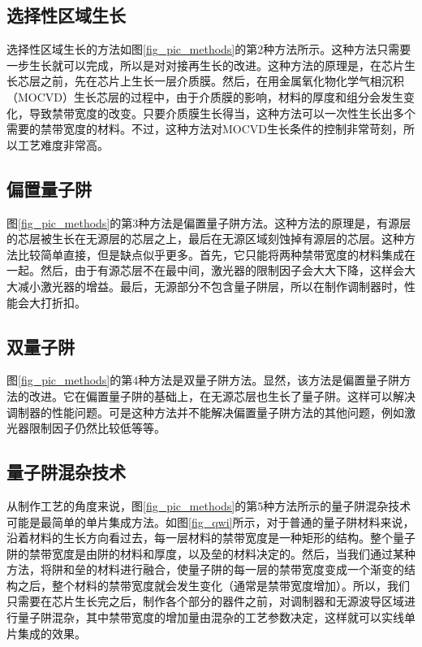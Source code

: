 \documentclass[oneside]{ZJUthesis}
\begin{document}
\subsection{选择性区域生长}

选择性区域生长的方法如图\ref{fig_pic_methods}的第2种方法所示。这种方法只需要一步生长就可以完成，所以是对对接再生长的改进。这种方法的原理是，在芯片生长芯层之前，先在芯片上生长一层介质膜。然后，在用金属氧化物化学气相沉积（MOCVD）生长芯层的过程中，由于介质膜的影响，材料的厚度和组分会发生变化，导致禁带宽度的改变。只要介质膜生长得当，这种方法可以一次性生长出多个需要的禁带宽度的材料。不过，这种方法对MOCVD生长条件的控制非常苛刻，所以工艺难度非常高。

\subsection{偏置量子阱}

图\ref{fig_pic_methods}的第3种方法是偏置量子阱方法。这种方法的原理是，有源层的芯层被生长在无源层的芯层之上，最后在无源区域刻蚀掉有源层的芯层。这种方法比较简单直接，但是缺点似乎更多。首先，它只能将两种禁带宽度的材料集成在一起。然后，由于有源芯层不在最中间，激光器的限制因子会大大下降，这样会大大减小激光器的增益。最后，无源部分不包含量子阱层，所以在制作调制器时，性能会大打折扣。

\subsection{双量子阱}

图\ref{fig_pic_methods}的第4种方法是双量子阱方法。显然，该方法是偏置量子阱方法的改进。它在偏置量子阱的基础上，在无源芯层也生长了量子阱。这样可以解决调制器的性能问题。可是这种方法并不能解决偏置量子阱方法的其他问题，例如激光器限制因子仍然比较低等等。

\subsection{量子阱混杂技术}

从制作工艺的角度来说，图\ref{fig_pic_methods}的第5种方法所示的量子阱混杂技术可能是最简单的单片集成方法。如图\ref{fig_qwi}所示，对于普通的量子阱材料来说，沿着材料的生长方向看过去，每一层材料的禁带宽度是一种矩形的结构。整个量子阱的禁带宽度是由阱的材料和厚度，以及垒的材料决定的。然后，当我们通过某种方法，将阱和垒的材料进行融合，使量子阱的每一层的禁带宽度变成一个渐变的结构之后，整个材料的禁带宽度就会发生变化（通常是禁带宽度增加）。所以，我们只需要在芯片生长完之后，制作各个部分的器件之前，对调制器和无源波导区域进行量子阱混杂，其中禁带宽度的增加量由混杂的工艺参数决定，这样就可以实线单片集成的效果。
\end{document}
